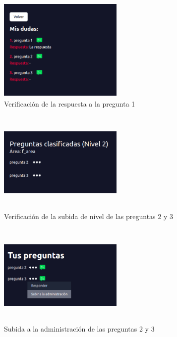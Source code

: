 \begin{figure}[h]
	\begin{center}
		\includegraphics[width=6cm, height=5cm]{verificar_respuesta_1.png}
		\caption{Verificación de la respuesta a la pregunta 1}
		\label{fig:f_verificar_respuesta1}
		
	\end{center}
\end{figure}

\begin{figure}[h]
	\begin{center}
		\includegraphics[width=6cm, height=5cm]{verificar_subida_2.png}
		\caption{Verificación de la subida de nivel de las preguntas 2 y 3}
		\label{fig:f_verificar_subida2}
		
	\end{center}
\end{figure}

\begin{figure}[h]
	\begin{center}
		\includegraphics[width=6cm, height=5cm]{subida_nivel3.png}
		\caption{Subida a la administración de las preguntas 2 y 3}
		\label{fig:f_subida3}
		
	\end{center}
\end{figure}

